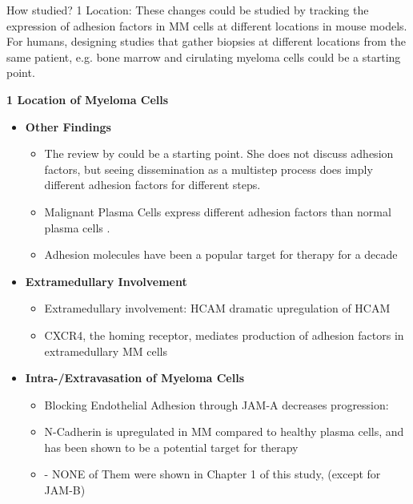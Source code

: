 How studied?
1 Location: These changes could be studied by tracking the
expression of adhesion factors in MM cells at different locations in mouse
models. For humans, designing studies that gather biopsies at different
locations from the same patient, e.g. bone marrow and cirulating myeloma cells
could be a starting point.




\textbf{1 Location of Myeloma Cells}
\begin{itemize}
      \item \textbf{Other Findings}
            \begin{itemize}
                  \item The review by
                        \citet{zeissigTumourDisseminationMultiple2020} could be
                        a starting point. She does not discuss adhesion factors,
                        but seeing dissemination as a multistep process does
                        imply different adhesion factors for different steps.
                  \item Malignant Plasma Cells express different adhesion factors
                        than normal plasma cells \cite{cookRoleAdhesionMolecules1997, bouzerdanAdhesionMoleculesMultiple2022}.

                  \item Adhesion molecules have been a popular target for therapy for a decade \cite{nairChapterSixEmerging2012}
            \end{itemize}

      \item \textbf{Extramedullary Involvement}
            \begin{itemize}
                  \item Extramedullary involvement: HCAM dramatic upregulation of HCAM
                  \item CXCR4, the homing receptor, mediates production of
                        adhesion factors in extramedullary MM cells \cite{roccaroCXCR4RegulatesExtraMedullary2015}
            \end{itemize}

      \item \textbf{Intra-/Extravasation of Myeloma Cells}
            \begin{itemize}
                  \item Blocking Endothelial Adhesion through JAM-A decreases progression: \cite{solimandoHaltingViciousCycle2020}
                  \item N-Cadherin is upregulated in MM compared to healthy plasma cells, and has been shown to be a potential target for therapy \cite{mrozikTherapeuticTargetingNcadherin2015}
                  \item - NONE of Them were shown in Chapter 1 of this study, (except for JAM-B)
            \end{itemize}


\end{itemize}
